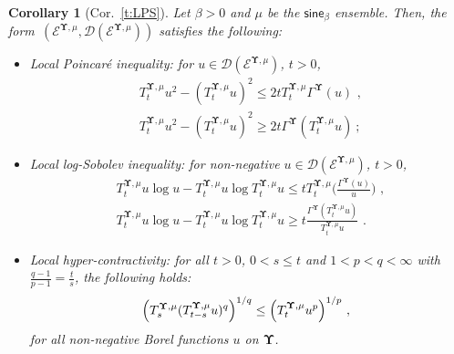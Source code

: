 \documentclass[11pt,letterpaper]{amsart}
\newcommand{\dom}[1]{\mathcal D(#1)}
\let\temp\phi
\let\phi\varphi
\let\varphi\temp
\newcommand{\comma}{\,\,\mathrm{,}\;\,}
\newcommand{\fstop}{\,\,\mathrm{.}}
\newcommand{\cdc}{\Gamma}
\newcommand{\QP}{{\mu}}
\newcommand{\dUpsilon}{{\mathbf \Upsilon}}
\newcommand{\U}{\dUpsilon}
\newcommand{\sine}{\mathsf{sine}}
\newcommand{\E}{\mathcal E}
\renewcommand{\1}{\mathbf 1}
\numberwithin{equation}{section}
\theoremstyle{plain}
\newtheorem{cor}[thm]{Corollary}%
\theoremstyle{definition}
\theoremstyle{remark}
\newcommand{\LP}{${\sf P}_{\loc}$}
\begin{document}
 \begin{cor}[Cor.~\ref{t:LPS}] \label{c:1}
Let $\beta>0$ and $\QP$ be the $\sine_\beta$ ensemble.  Then, the form~$(\E^{\U, \QP}, \dom{\E^{\U, \QP}})$ satisfies the following:
\begin{itemize}%
\item Local Poincar\'e inequality: for $u \in \dom{\E^{\U, \QP}}$, $t >0$,
\begin{align*}
&T^{\U, \QP}_tu^2- (T^{\U, \QP}_tu)^2 \le 2tT^{\U, \QP}_t\cdc^{\U}(u)  \comma %
\\
&T^{\U, \QP}_tu^2- (T^{\U, \QP}_tu)^2 \ge 2t\cdc^{\U} (T^{\U, \QP}_tu) \ ;
\end{align*}
\item Local log-Sobolev inequality: for non-negative $u \in \dom{\E^{\U, \QP}}$, $t>0$,
\begin{align*}
&T^{\U, \QP}_tu\log u- T^{\U, \QP}_tu\log T^{\U, \QP}_t u \le t T^{\U, \QP}_t\biggl( \frac{\cdc^{\U}(u)}{u} \biggr) \comma
\\
&T^{\U, \QP}_tu\log u- T^{\U, \QP}_tu\log T^{\U, \QP}_t u \ge t \frac{\cdc^{\U}(T^{\U, \QP}_t u)}{T^{\U, \QP}_t u}  \fstop
\end{align*}
\item Local hyper-contractivity: for all $t>0$, $0<s\le t$ and $1<p<q<\infty$ with $\frac{q-1}{p-1}=\frac{t}{s}$, the following holds:
$$\Bigl( T_s^{\U, \QP}(T^{\U, \QP}_{t-s}u)^{q}\Bigr)^{1/q} \le \Bigl( T_t^{\U, \QP}u^p\Bigr)^{1/p} \comma$$
for all non-negative Borel functions $u$ on $\U$. 
\end{itemize}
\end{cor}
\smallskip

\end{document}
